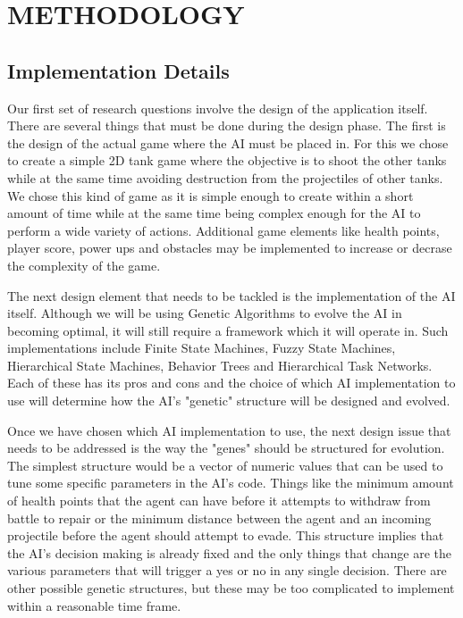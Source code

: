 \chapter{METHODOLOGY}
\section{Implementation Details}

Our first set of research questions involve the design of the application itself.
There are several things that must be done during the design phase. The first is
the design of the actual game where the AI must be placed in. For this we chose to
create a simple 2D tank game where the objective is to shoot the other tanks
while at the same time avoiding destruction from the projectiles of other tanks. We
chose this kind of game as it is simple enough to create within a short amount of time
while at the same time being complex enough for the AI to perform a wide variety of
actions. Additional game elements like health points, player score, power ups and
obstacles may be implemented to increase or decrase the complexity of the game.


The next design element that needs to be tackled is the implementation of the AI itself.
Although we will be using Genetic Algorithms to evolve the AI in becoming optimal, it
will still require a framework which it will operate in. Such implementations include
Finite State Machines, Fuzzy State Machines, Hierarchical State Machines, Behavior Trees
and Hierarchical Task Networks. Each of these has its pros and cons and the choice of
which AI implementation to use will determine how the AI's "genetic" structure will be
designed and evolved.


Once we have chosen which AI implementation to use, the next design issue that needs to
be addressed is the way the "genes" should be structured for evolution. The simplest
structure would be a vector of numeric values that can be used to tune some specific
parameters in the AI's code. Things like the minimum amount of health points that the agent can have
before it attempts to withdraw from battle to repair or the minimum distance between the
agent and an incoming projectile before the agent should attempt to evade. This structure
implies that the AI's decision making is already fixed and the only things that change
are the various parameters that will trigger a yes or no in any single decision. There
are other possible genetic structures, but these may be too complicated to implement
within a reasonable time frame.